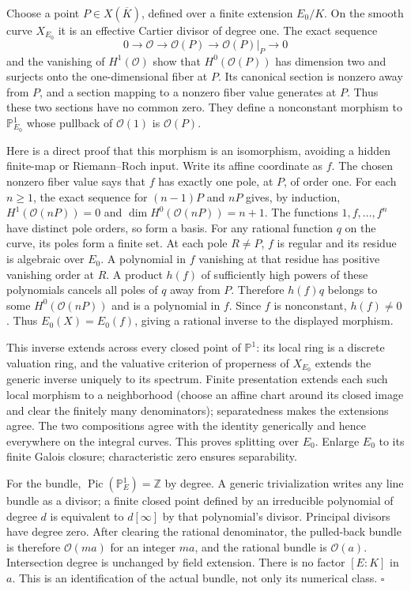 \documentclass[
  11pt,
]{article}
\begin{document}
Choose a point \(P\in X(\overline K)\), defined over a finite extension
\(E_0/K\). On the smooth curve \(X_{E_0}\) it is an effective Cartier
divisor of degree one. The exact sequence \[
0\longrightarrow\mathcal O\longrightarrow\mathcal O(P)
\longrightarrow\mathcal O(P)|_P\longrightarrow0
\] and the vanishing of \(H^1(\mathcal O)\) show that
\(H^0(\mathcal O(P))\) has dimension two and surjects onto the
one-dimensional fiber at \(P\). Its canonical section is nonzero away
from \(P\), and a section mapping to a nonzero fiber value generates at
\(P\). Thus these two sections have no common zero. They define a
nonconstant morphism to \(\mathbb P^1_{E_0}\) whose pullback of
\(\mathcal O(1)\) is \(\mathcal O(P)\).

Here is a direct proof that this morphism is an isomorphism, avoiding a
hidden finite-map or Riemann--Roch input. Write its affine coordinate as
\(f\). The chosen nonzero fiber value says that \(f\) has exactly one
pole, at \(P\), of order one. For each \(n\geq1\), the exact sequence
for \((n-1)P\) and \(nP\) gives, by induction, \(H^1(\mathcal O(nP))=0\)
and \(\dim H^0(\mathcal O(nP))=n+1\). The functions \(1,f,\ldots,f^n\)
have distinct pole orders, so form a basis. For any rational function
\(q\) on the curve, its poles form a finite set. At each pole
\(R\ne P\), \(f\) is regular and its residue is algebraic over \(E_0\).
A polynomial in \(f\) vanishing at that residue has positive vanishing
order at \(R\). A product \(h(f)\) of sufficiently high powers of these
polynomials cancels all poles of \(q\) away from \(P\). Therefore
\(h(f)q\) belongs to some \(H^0(\mathcal O(nP))\) and is a polynomial in
\(f\). Since \(f\) is nonconstant, \(h(f)\ne0\). Thus \(E_0(X)=E_0(f)\),
giving a rational inverse to the displayed morphism.

This inverse extends across every closed point of \(\mathbb P^1\): its
local ring is a discrete valuation ring, and the valuative criterion of
properness of \(X_{E_0}\) extends the generic inverse uniquely to its
spectrum. Finite presentation extends each such local morphism to a
neighborhood (choose an affine chart around its closed image and clear
the finitely many denominators); separatedness makes the extensions
agree. The two compositions agree with the identity generically and
hence everywhere on the integral curves. This proves splitting over
\(E_0\). Enlarge \(E_0\) to its finite Galois closure; characteristic
zero ensures separability.

For the bundle, \(\operatorname{Pic}(\mathbb P^1_E)=\mathbb Z\) by
degree. A generic trivialization writes any line bundle as a divisor; a
finite closed point defined by an irreducible polynomial of degree \(d\)
is equivalent to \(d[\infty]\) by that polynomial's divisor. Principal
divisors have degree zero. After clearing the rational denominator, the
pulled-back bundle is therefore \(\mathcal O(ma)\) for an integer
\(ma\), and the rational bundle is \(\mathcal O(a)\). Intersection
degree is unchanged by field extension. There is no factor \([E:K]\) in
\(a\). This is an identification of the actual bundle, not only its
numerical class. \(\square\)
\end{document}
